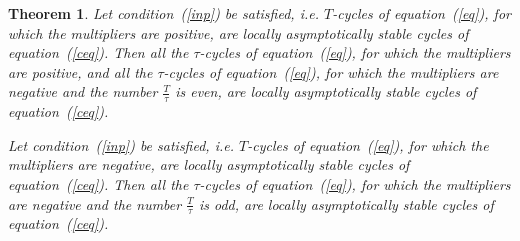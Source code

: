 \documentclass[12pt,a4paper]{amsart}
\newtheorem{theorem}{Theorem}
\begin{document}
\begin{theorem}\label{t4}
Let condition~(\ref{inp}) be satisfied, i.e. $T$-cycles of equation~(\ref{eq}), for which the multipliers are positive, are locally asymptotically stable cycles 
of equation~(\ref{ceq}). Then all the $\tau$-cycles of equation~(\ref{eq}), for which the multipliers are positive, and all the $\tau$-cycles of 
equation~(\ref{eq}), for which the multipliers are negative and the number $\frac{T}{\tau}$ is even, are locally asymptotically stable cycles of 
equation~(\ref{ceq}).

Let condition~(\ref{inp}) be satisfied, i.e. $T$-cycles of equation~(\ref{eq}), for which the multipliers are negative, are locally asymptotically stable cycles 
of equation~(\ref{ceq}). Then all the $\tau$-cycles of equation~(\ref{eq}), for which the multipliers are negative and the number $\frac{T}{\tau}$ is odd, 
are locally asymptotically stable cycles of equation~(\ref{ceq}).
\end{theorem}
\end{document}
